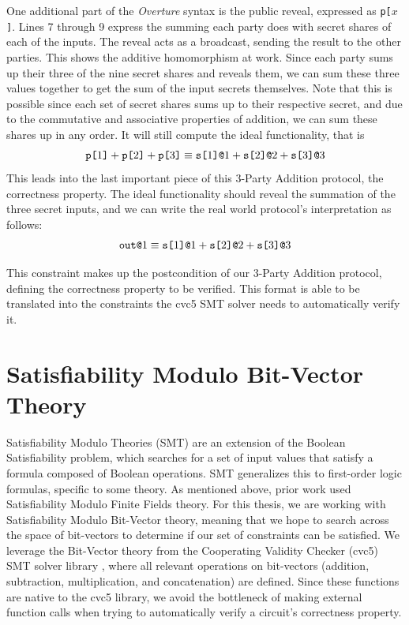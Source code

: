 \documentclass{article}
\begin{document}
One additional part of the \textit{Overture} syntax is the public reveal, expressed as \texttt{p[$x$]}. Lines 7 through 9 express the summing each party does with secret shares of each of the inputs. The reveal acts as a broadcast, sending the result to the other parties. This shows the additive homomorphism at work. Since each party sums up their three of the nine secret shares and reveals them, we can sum these three values together to get the sum of the input secrets themselves. Note that this is possible since each set of secret shares sums up to their respective secret, and due to the commutative and associative properties of addition, we can sum these shares up in any order. It will still compute the ideal functionality, that is $$\texttt{p[}1\texttt{]} + \texttt{p[}2\texttt{]} + \texttt{p[}3\texttt{]} \equiv \texttt{s[}1\texttt{]}\texttt{@}1 + \texttt{s[}2\texttt{]}\texttt{@}2 + \texttt{s[}3\texttt{]}\texttt{@}3$$ This leads into the last important piece of this 3-Party Addition protocol, the correctness property. The ideal functionality should reveal the summation of the three secret inputs, and we can write the real world protocol's interpretation as follows:
{$$\texttt{out}\texttt{@}1 \equiv \texttt{s[}1\texttt{]}\texttt{@}1 + \texttt{s[}2\texttt{]}\texttt{@}2 + \texttt{s[}3\texttt{]}\texttt{@}3\strut$$}

This constraint makes up the postcondition of our 3-Party Addition protocol, defining the correctness property to be verified. This format is able to be translated into the constraints the cvc5 SMT solver needs to automatically verify it.

\section{Satisfiability Modulo Bit-Vector Theory}
Satisfiability Modulo Theories (SMT) are an extension of the Boolean Satisfiability problem, which searches for a set of input values that satisfy a formula composed of Boolean operations. SMT generalizes this to first-order logic formulas, specific to some theory. As mentioned above, prior work used Satisfiability Modulo Finite Fields theory. For this thesis, we are working with Satisfiability Modulo Bit-Vector theory, meaning that we hope to search across the space of bit-vectors to determine if our set of constraints can be satisfied. We leverage the Bit-Vector theory from the Cooperating Validity Checker (cvc5) SMT solver library \cite{cvc5}, where all relevant operations on bit-vectors (addition, subtraction, multiplication, and concatenation) are defined. Since these functions are native to the cvc5 library, we avoid the bottleneck of making external function calls when trying to automatically verify a circuit's correctness property. 
\end{document}
